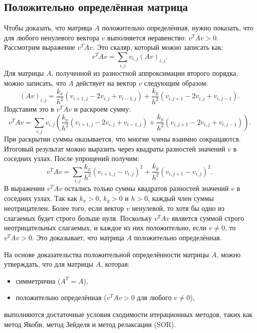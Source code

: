 \documentclass[a4paper, fleqn]{report}
\begin{document}
\subsection*{Положительно определённая матрица}
Чтобы доказать, что матрица $A$ положительно определённая, нужно показать, что для любого ненулевого вектора $v$ выполняется неравенство: $v^T A v > 0$.
Рассмотрим выражение $v^T A v$. Это скаляр, который можно записать как:
\[
v^T A v = \sum_{i,j} v_{i,j} (Av)_{i,j}.
\]
Для матрицы $A$, полученной из разностной аппроксимации второго порядка, можно записать, что $A$ действует на вектор $v$ следующим образом:
\[
(Av)_{i,j} = \frac{k_x}{h^2}(v_{i+1,j} - 2v_{i,j} + v_{i-1,j}) + \frac{k_y}{h^2}(v_{i,j+1} - 2v_{i,j} + v_{i,j-1}).
\]
Подставим это в $v^T A v$ и раскроем сумму:
\[
v^T A v = \sum_{i,j} v_{i,j} \left( \frac{k_x}{h^2}(v_{i+1,j} - 2v_{i,j} + v_{i-1,j}) + \frac{k_y}{h^2}(v_{i,j+1} - 2v_{i,j} + v_{i,j-1}) \right).
\]
При раскрытии суммы оказывается, что многие члены взаимно сокращаются. Итоговый результат можно выразить через квадраты разностей значений $v$ в соседних узлах. После упрощений получим:
\[
v^T A v = \sum_{i,j} \frac{k_x}{h^2} (v_{i+1,j} - v_{i,j})^2 + \frac{k_y}{h^2} (v_{i,j+1} - v_{i,j})^2.
\]
В выражении $v^T A v$ остались только суммы квадратов разностей значений $v$ в соседних узлах. Так как $k_x > 0$, $k_y > 0$ и $h > 0$, каждый член суммы неотрицателен. Более того, если вектор $v$ ненулевой, то хотя бы одно из слагаемых будет строго больше нуля.
Поскольку $v^T A v$ является суммой строго неотрицательных слагаемых, и каждое из них положительно, если $v \neq 0$, то $v^T A v > 0$. Это доказывает, что матрица $A$ положительно определённая.


На основе доказательства положительной определённости матрицы $A$, можно утверждать, что для матрицы $A$, которая:
\begin{itemize}
    \item симметрична ($A^T = A$),
    \item положительно определённая ($v^T A v > 0$ для любого $v \neq 0$),
\end{itemize}
выполняются достаточные условия сходимости итерационных методов, таких как метод Якоби, метод Зейделя и метод релаксации (SOR). 
\end{document}
